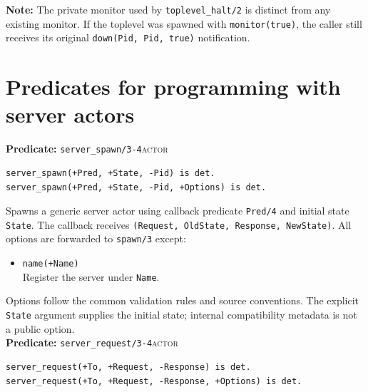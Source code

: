 \medskip
\noindent \textbf{Note:} The private monitor used by
\texttt{toplevel\_\allowbreak{}halt/\allowbreak{}2} is distinct from any existing monitor. If the
toplevel was spawned with \texttt{monitor(\allowbreak{}true)}, the caller still receives
its original \texttt{down(\allowbreak{}Pid,\allowbreak{}\,\allowbreak{}Pid,\allowbreak{}\,\allowbreak{}true)} notification.\\


\section{Predicates for programming with server actors}\label{sec:server-api}


\noindent \textbf{Predicate:} \texttt{server\_\allowbreak{}spawn/\allowbreak{}3-4}\hfill\textsc{actor}

\begin{verbatim}
server_spawn(+Pred, +State, -Pid) is det.
server_spawn(+Pred, +State, -Pid, +Options) is det.
\end{verbatim}

\noindent Spawns a generic server actor using callback predicate
\texttt{Pred/\allowbreak{}4} and initial state \texttt{State}. The callback receives
\texttt{(\allowbreak{}Request,\allowbreak{} OldState,\allowbreak{} Response,\allowbreak{} NewState)}. All options are forwarded to
\texttt{spawn/\allowbreak{}3} except:

\begin{itemize}
\item
  \texttt{name(\allowbreak{}+Name)}\\
  Register the server under \texttt{Name}.
\end{itemize}

Options follow the common validation rules and source conventions.
The explicit \texttt{State} argument supplies the initial state; internal
compatibility metadata is not a public option.\\


\noindent \textbf{Predicate:} \texttt{server\_\allowbreak{}request/\allowbreak{}3-4}\hfill\textsc{actor}

\begin{verbatim}
server_request(+To, +Request, -Response) is det.
server_request(+To, +Request, -Response, +Options) is det.
\end{verbatim}

